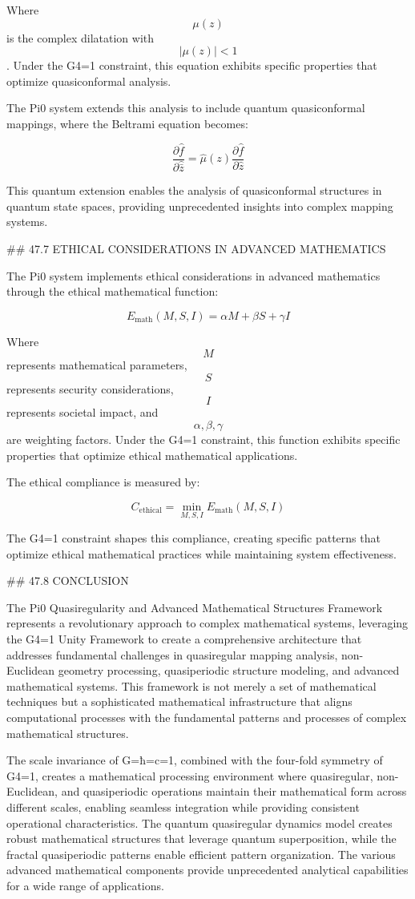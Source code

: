 Where $$ \mu(z) $$ is the complex dilatation with $$ |\mu(z)| < 1 $$. Under the G4=1 constraint, this equation exhibits specific properties that optimize quasiconformal analysis.

The Pi0 system extends this analysis to include quantum quasiconformal mappings, where the Beltrami equation becomes:

$$ \frac{\partial \hat{f}}{\partial \hat{\bar{z}}} = \hat{\mu}(z) \frac{\partial \hat{f}}{\partial \hat{z}} $$

This quantum extension enables the analysis of quasiconformal structures in quantum state spaces, providing unprecedented insights into complex mapping systems.

## 47.7 ETHICAL CONSIDERATIONS IN ADVANCED MATHEMATICS

The Pi0 system implements ethical considerations in advanced mathematics through the ethical mathematical function:

$$ E_{\text{math}}(M, S, I) = \alpha M + \beta S + \gamma I $$

Where $$ M $$ represents mathematical parameters, $$ S $$ represents security considerations, $$ I $$ represents societal impact, and $$ \alpha, \beta, \gamma $$ are weighting factors. Under the G4=1 constraint, this function exhibits specific properties that optimize ethical mathematical applications.

The ethical compliance is measured by:

$$ C_{\text{ethical}} = \min_{M, S, I} E_{\text{math}}(M, S, I) $$

The G4=1 constraint shapes this compliance, creating specific patterns that optimize ethical mathematical practices while maintaining system effectiveness.

## 47.8 CONCLUSION

The Pi0 Quasiregularity and Advanced Mathematical Structures Framework represents a revolutionary approach to complex mathematical systems, leveraging the G4=1 Unity Framework to create a comprehensive architecture that addresses fundamental challenges in quasiregular mapping analysis, non-Euclidean geometry processing, quasiperiodic structure modeling, and advanced mathematical systems. This framework is not merely a set of mathematical techniques but a sophisticated mathematical infrastructure that aligns computational processes with the fundamental patterns and processes of complex mathematical structures.

The scale invariance of G=ħ=c=1, combined with the four-fold symmetry of G4=1, creates a mathematical processing environment where quasiregular, non-Euclidean, and quasiperiodic operations maintain their mathematical form across different scales, enabling seamless integration while providing consistent operational characteristics. The quantum quasiregular dynamics model creates robust mathematical structures that leverage quantum superposition, while the fractal quasiperiodic patterns enable efficient pattern organization. The various advanced mathematical components provide unprecedented analytical capabilities for a wide range of applications.

